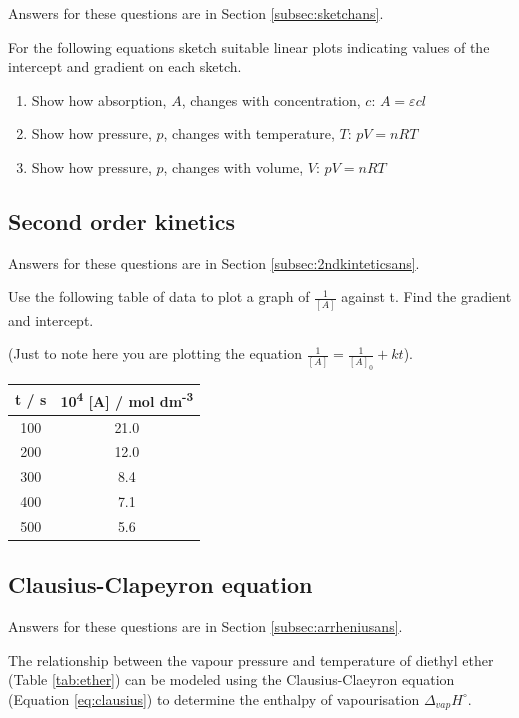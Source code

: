 \documentclass[
]{book}
\begin{document}
Answers for these questions are in Section \ref{subsec:sketchans}.

For the following equations sketch suitable linear plots indicating values of the intercept and gradient on each sketch.

\begin{enumerate}
\def\labelenumi{\arabic{enumi}.}
\item
  Show how absorption, \(A\), changes with concentration, \(c\): \(A = \varepsilon c l\)
\item
  Show how pressure, \(p\), changes with temperature, \(T\): \(pV = nRT\)
\item
  Show how pressure, \(p\), changes with volume, \(V\): \(pV = nRT\)
\end{enumerate}

\hypertarget{subsec:2ndkintetics}{%
\subsection{Second order kinetics}\label{subsec:2ndkintetics}}

Answers for these questions are in Section \ref{subsec:2ndkinteticsans}.

Use the following table of data to plot a graph of \(\frac{1}{[A]}\) against t. Find the gradient and intercept.

(Just to note here you are plotting the equation \(\frac{1}{[A]}=\frac{1}{[A]_0}+kt\)).

\begin{longtable}[]{@{}cc@{}}
\toprule
t / s & 10\textsuperscript{4} {[}A{]} / mol dm\textsuperscript{-3}\tabularnewline
\midrule
\endhead
100 & 21.0\tabularnewline
200 & 12.0\tabularnewline
300 & 8.4\tabularnewline
400 & 7.1\tabularnewline
500 & 5.6\tabularnewline
\bottomrule
\end{longtable}

\hypertarget{subsec:clausius}{%
\subsection{Clausius-Clapeyron equation}\label{subsec:clausius}}

Answers for these questions are in Section \ref{subsec:arrheniusans}.

The relationship between the vapour pressure and temperature of diethyl ether (Table \ref{tab:ether}) can be modeled using the Clausius-Claeyron equation (Equation \eqref{eq:clausius}) to determine the enthalpy of vapourisation \(\Delta _{vap}H^\circ\).
\end{document}
